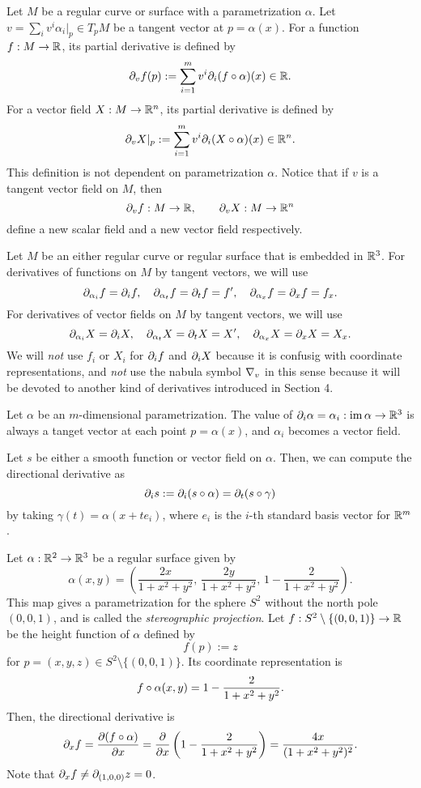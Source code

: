 \documentclass{../exp}
\def\a{\alpha}
\begin{document}
\begin{defn}
Let $M$ be a regular curve or surface with a parametrization $\a$.
Let $v=\sum_iv^i\a_i|_p\in T_pM$ be a tangent vector at $p=\a(x)$.
For a function $f:M\to\R$, its partial derivative is defined by
\[\pd_vf(p):=\sum_{i=1}^mv^i\pd_i(f\o\a)(x)\in\R.\]
For a vector field $X:M\to\R^n$, its partial derivative is defined by
\[\pd_vX|_p:=\sum_{i=1}^mv^i\pd_i(X\o\a)(x)\in\R^n.\]
This definition is not dependent on parametrization $\a$.
Notice that if $v$ is a tangent vector field on $M$, then
\[\pd_vf:M\to\R,\qquad\pd_vX:M\to\R^n\]
define a new scalar field and a new vector field respectively.
\end{defn}

\begin{notn*}
Let $M$ be an either regular curve or regular surface that is embedded in $\mathbb{R}^3$.
For derivatives of functions on $M$ by tangent vectors, we will use
\[\pd_{\a_i}f=\pd_if,\quad\pd_{\a_t}f=\pd_tf=f',\quad\pd_{\a_x}f=\pd_xf=f_x.\]
For derivatives of vector fields on $M$ by tangent vectors, we will use
\[\pd_{\a_i}X=\pd_iX,\quad\pd_{\a_t}X=\pd_tX=X',\quad\pd_{\a_x}X=\pd_xX=X_x.\]
We will \emph{not} use $f_i$ or $X_i$ for $\pd_if$ and $\pd_iX$ because it is confusig with coordinate representations, and \emph{not} use the nabula symbol $\nabla_v$ in this sense because it will be devoted to another kind of derivatives introduced in Section 4.
\end{notn*}

\begin{exs}
\item
Let $\a$ be an $m$-dimensional parametrization.
The value of $\pd_i\a=\a_i:\im\a\to\R^3$ is always a tanget vector at each point $p=\a(x)$, and $\a_i$ becomes a vector field.

Let $s$ be either a smooth function or vector field on $\a$.
Then, we can compute the directional derivative as
\[\pd_is:=\pd_i(s\o\a)=\pd_t(s\o\gamma)\]
by taking $\gamma(t)=\a(x+te_i)$, where $e_i$ is the $i$-th standard basis vector for $\mathbb{R}^m$.

\item
Let $\a:\R^2\to\R^3$ be a regular surface given by
\[\a(x,y)=\left(\frac{2x}{1+x^2+y^2},\,\frac{2y}{1+x^2+y^2},\,1-\frac2{1+x^2+y^2}\right).\]
This map gives a parametrization for the sphere $S^2$ without the north pole $(0,0,1)$, and is called the \emph{stereographic projection}.
Let $f:S^2\setminus\{(0,0,1)\}\to\R$ be the height function of $\a$ defined by
\[f(p):=z\]
for $p=(x,y,z)\in S^2\setminus\{(0,0,1)\}$.
Its coordinate representation is
\[f\o\a(x,y)=1-\frac2{1+x^2+y^2}.\]
Then, the directional derivative is
\[\pd_xf=\pd{(f\o\a)}{x}=\pd{x}\left(1-\frac2{1+x^2+y^2}\right)=\frac{4x}{(1+x^2+y^2)^2}.\]
Note that $\pd_xf\ne\pd_{(1,0,0)}z=0$.
\end{exs}
\end{document}
